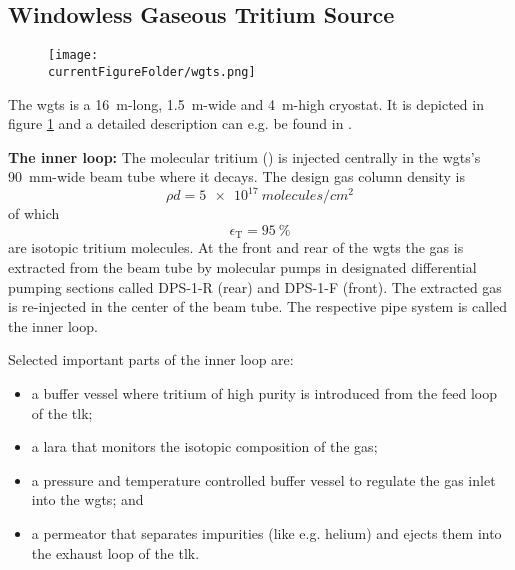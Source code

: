 \subsection{Windowless Gaseous Tritium Source}
\label{sec:wgts}%
\begin{figure}
    \centering
    \texttt{[image: \\currentFigureFolder/wgts.png]}
    \label{fig:wgts}
\end{figure}%
The \gls{wgts} is a \SI{16}{m}-long, \SI{1.5}{m}-wide and \SI{4}{m}-high cryostat. It is depicted in figure \ref{fig:wgts} and a detailed description can e.g. be found in \cite{Grohman2008}.
{\par \textbf{The inner loop:} The molecular tritium () is injected centrally in the \gls{wgts}'s \SI{90}{mm}-wide beam tube where it decays. The design gas column density is 
\begin{equation}
    \label{eq:columnDensity}
    \rho d = \SI{5e17}{molecules/{cm}^2}
\end{equation}
of which \begin{equation}
    \epsilon_\text{T} = \SI{95}{\percent}
\end{equation}
are isotopic tritium molecules. At the front and rear of the \gls{wgts} the gas is extracted from the beam tube by molecular pumps in designated differential pumping sections called DPS-1-R (rear) and DPS-1-F (front). The extracted gas is re-injected in the center of the beam tube. The respective pipe system is called the inner loop.
\begin{samepage}
Selected important parts of the inner loop are:
\begin{itemize}
\renewcommand{\labelitemi}{$\bullet$}
    \item a buffer vessel where tritium of high purity is introduced from the feed loop of the \gls{tlk};
    \item a \gls{lara} that monitors the isotopic composition of the gas;
    \item a pressure and temperature controlled buffer vessel to regulate the gas inlet into the \gls{wgts}; and
    \item a permeator that separates impurities (like e.g. helium) and ejects them into the exhaust loop of the \gls{tlk}.
\end{itemize}
\end{samepage}}


